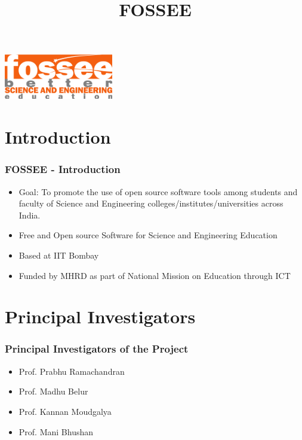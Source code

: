 \documentclass{beamer}
\title{FOSSEE}
\institute[IIT Bombay] {\Large{IIT Bombay}}
\date{}
\begin{document}
\begin{frame}
   \begin{center}
   \maketitle
   \includegraphics[scale=2]{fossee.png}    
   \end{center}  
\end{frame}


\section{Introduction}
\begin{frame}
  \frametitle{{FOSSEE} - Introduction}
  \begin{itemize}
  \item Goal: To promote the use of open source software tools among students and faculty of Science and Engineering colleges/institutes/universities across India.
  \item Free and Open source Software for Science and Engineering Education 
  \item Based at IIT Bombay
  \item Funded by MHRD as part of National Mission on Education through ICT
  \end{itemize}  
\end{frame}

\section{Principal Investigators}
\begin{frame}
  \frametitle{Principal Investigators of the Project}
  \begin{itemize}
  \item Prof. Prabhu Ramachandran
  \item Prof. Madhu Belur
  \item Prof. Kannan Moudgalya
  \item Prof. Mani Bhushan
  \end{itemize}
\end{frame}
\end{document}
